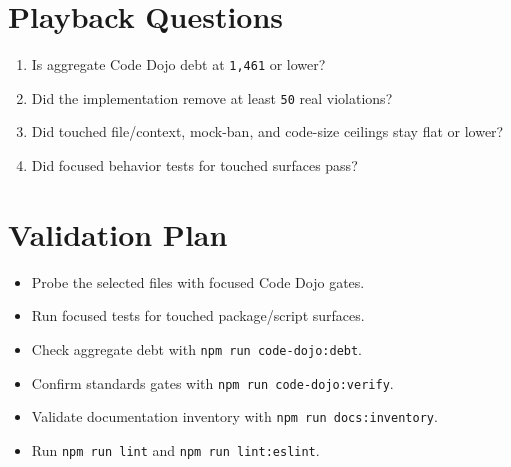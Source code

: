 \section{Playback Questions}\label{record-227-playback-questions}

\begin{enumerate}
\def\labelenumi{\arabic{enumi}.}
\tightlist
\item
  Is aggregate Code Dojo debt at \texttt{1\allowbreak{},\allowbreak{}4\allowbreak{}6\allowbreak{}1} or lower?
\item
  Did the implementation remove at least \texttt{5\allowbreak{}0} real violations?
\item
  Did touched file/context, mock-ban, and code-size ceilings stay flat or lower?
\item
  Did focused behavior tests for touched surfaces pass?
\end{enumerate}

\section{Validation Plan}\label{record-227-validation-plan}

\begin{itemize}
\tightlist
\item
  Probe the selected files with focused Code Dojo gates.
\item
  Run focused tests for touched package/script surfaces.
\item
  Check aggregate debt with \texttt{n\allowbreak{}p\allowbreak{}m\allowbreak{} \allowbreak{}r\allowbreak{}u\allowbreak{}n\allowbreak{} \allowbreak{}c\allowbreak{}o\allowbreak{}d\allowbreak{}e\allowbreak{}-\allowbreak{}d\allowbreak{}o\allowbreak{}j\allowbreak{}o\allowbreak{}:\allowbreak{}d\allowbreak{}e\allowbreak{}b\allowbreak{}t}.
\item
  Confirm standards gates with \texttt{n\allowbreak{}p\allowbreak{}m\allowbreak{} \allowbreak{}r\allowbreak{}u\allowbreak{}n\allowbreak{} \allowbreak{}c\allowbreak{}o\allowbreak{}d\allowbreak{}e\allowbreak{}-\allowbreak{}d\allowbreak{}o\allowbreak{}j\allowbreak{}o\allowbreak{}:\allowbreak{}v\allowbreak{}e\allowbreak{}r\allowbreak{}i\allowbreak{}f\allowbreak{}y}.
\item
  Validate documentation inventory with \texttt{n\allowbreak{}p\allowbreak{}m\allowbreak{} \allowbreak{}r\allowbreak{}u\allowbreak{}n\allowbreak{} \allowbreak{}d\allowbreak{}o\allowbreak{}c\allowbreak{}s\allowbreak{}:\allowbreak{}i\allowbreak{}n\allowbreak{}v\allowbreak{}e\allowbreak{}n\allowbreak{}t\allowbreak{}o\allowbreak{}r\allowbreak{}y}.
\item
  Run \texttt{n\allowbreak{}p\allowbreak{}m\allowbreak{} \allowbreak{}r\allowbreak{}u\allowbreak{}n\allowbreak{} \allowbreak{}l\allowbreak{}i\allowbreak{}n\allowbreak{}t} and \texttt{n\allowbreak{}p\allowbreak{}m\allowbreak{} \allowbreak{}r\allowbreak{}u\allowbreak{}n\allowbreak{} \allowbreak{}l\allowbreak{}i\allowbreak{}n\allowbreak{}t\allowbreak{}:\allowbreak{}e\allowbreak{}s\allowbreak{}l\allowbreak{}i\allowbreak{}n\allowbreak{}t}.
\end{itemize}

